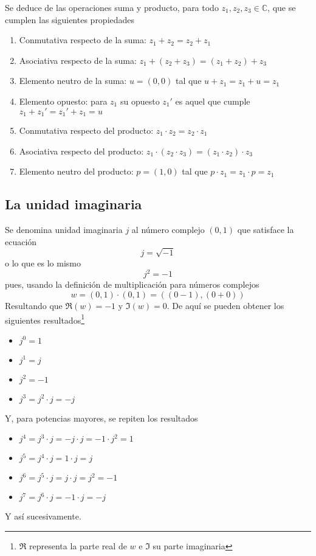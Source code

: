 Se deduce de las operaciones suma y producto, para todo $z_1,z_2,z_3 \in \mathbb{C}$, que se cumplen las siguientes propiedades
\begin{enumerate}
  \item Conmutativa respecto de la suma: $z_1 + z_2 = z_2 + z_1$
  \item Asociativa respecto de la suma: $z_1 + (z_2 + z_3) = (z_1 + z_2) + z_3$
  \item Elemento neutro de la suma: $u=(0,0)$ tal que $u + z_1 = z_1 + u = z_1$
  \item Elemento opuesto: para $z_1$ su opuesto $z_1'$ es aquel que cumple $z_1 + z_1' = z_1' + z_1 = u$
  \item Conmutativa respecto del producto: $z_1 \cdot z_2 = z_2 \cdot z_1$
  \item Asociativa respecto del producto: $z_1 \cdot (z_2 \cdot z_3) = (z_1 \cdot z_2)\cdot z_3$
  \item Elemento neutro del producto: $p=(1,0)$ tal que $p\cdot z_1 = z_1 \cdot p = z_1$
\end{enumerate}

\subsection{La unidad imaginaria}

Se denomina unidad imaginaria $j$ al número complejo $(0,1)$ que satisface la ecuación
$$
j = \sqrt{-1}
$$
o lo que es lo mismo
$$
j^2 = -1
$$
pues, usando la definición de multiplicación para números complejos
$$
w=(0,1)\cdot(0,1)=((0-1),(0+0))
$$
Resultando que $\Re(w)=-1$ y $\Im(w)=0$. De aquí se pueden obtener los siguientes resultados\footnote{$\Re$ representa la parte real de $w$ e $\Im$ su parte imaginaria}
\begin{itemize}
  \item $j^0 = 1$
  \item $j^1 = j$
  \item $j^2 = -1$
  \item $j^3 = j^2\cdot j= -j$
\end{itemize}
Y, para potencias mayores, se repiten los resultados
\begin{itemize}
  \item $j^4=j^3\cdot j = -j\cdot j = -1 \cdot j^2 = 1$
  \item $j^5=j^4\cdot j = 1 \cdot j = j$
  \item $j^6=j^5\cdot j = j \cdot j = j^2 = -1$
  \item $j^7=j^6\cdot j = -1 \cdot j = -j$
\end{itemize}
Y así sucesivamente.

